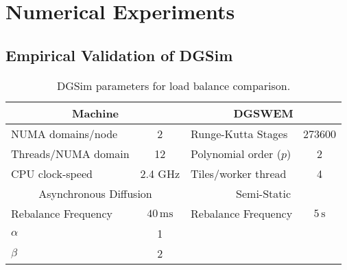 \section{Numerical Experiments}
\label{sec:experiments}


\subsection{Empirical Validation of DGSim}
\label{sec:experiments:validation}
\begin{table}
\caption{DGSim parameters for load balance comparison.
}
\label{tab:lbc:machine}
\centering
{ \scriptsize
\begin{tabular}{|l|c|l|c|}
\hline
\multicolumn{2}{|c|}{Machine} & \multicolumn{2}{|c|}{DGSWEM} \\
\hline
NUMA domains/node   & 2       & Runge-Kutta Stages     & 273600 \\
Threads/NUMA domain & 12      & Polynomial order ($p$) & 2      \\ 
CPU clock-speed & 2.4 GHz & Tiles/worker thread    & 4      \\
\hline
\multicolumn{2}{|c|}{Asynchronous Diffusion} & \multicolumn{2}{|c|}{Semi-Static} \\
\hline
Rebalance Frequency &  $40\,\mathrm{ms}$  & Rebalance Frequency & $5\,\mathrm{s}$ \\
$\alpha$ & 1 & &  \\
$\beta$ & 2 & & \\
\hline
\end{tabular}
}
\end{table}

